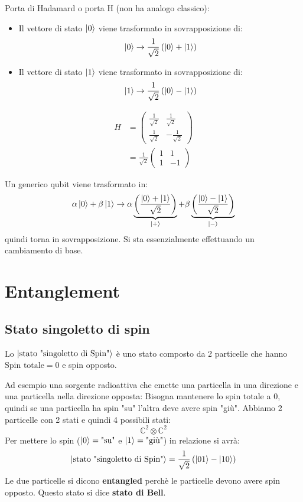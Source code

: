 \documentclass[a4paper]{article}
\begin{document}
\vspace{1em}
\noindent
Porta di Hadamard o porta H (non ha analogo classico):
\begin{itemize}
  \item 
    Il vettore di stato \( \ket{0} \) viene trasformato in sovrapposizione di:
    \[
      \ket{0} \to \frac{1}{\sqrt{2}} \left( \ket{0} + \ket{1} \right)
    \] 
  \item 
    Il vettore di stato \( \ket{1} \) viene trasformato in sovrapposizione di:
    \[
      \ket{1} \to \frac{1}{\sqrt{2}} \left( \ket{0} - \ket{1} \right)
    \]
\end{itemize}
\[
  \begin{aligned}
    H &= \begin{pmatrix} 
      \frac{1}{\sqrt{2}} & \frac{1}{\sqrt{2}}\\
      \frac{1}{\sqrt{2}} & -\frac{1}{\sqrt{2}}
    \end{pmatrix} \\
      &= \frac{1}{\sqrt{2}} \begin{pmatrix} 
        1 & 1\\
        1 & -1
      \end{pmatrix} 
  \end{aligned}
\] 

\vspace{1em}
\noindent
Un generico qubit viene trasformato in:
\[
  \alpha \ket{0} + \beta \ket{1} \to 
  \alpha \underbrace{\left( \frac{\ket{0} + \ket{1}}{\sqrt{2} } \right)}_{\ket{+}} +
  \beta \underbrace{\left( \frac{\ket{0} - \ket{1}}{\sqrt{2} } \right)}_{\ket{-}}
\] 
quindi torna in sovrapposizione. Si sta essenzialmente effettuando un cambiamento di base.

\section{Entanglement}
\subsection{Stato singoletto di spin}
Lo \( \ket{\text{stato "singoletto di Spin"}} \) è uno stato composto da 2 particelle
che hanno \( \text{Spin totale} = 0 \)  e spin opposto.

\vspace{1em}
\noindent
Ad esempio una sorgente
radioattiva che emette una particella in una direzione e una particella nella direzione
opposta:
\label{17-01-D2}
\noindent
Bisogna mantenere lo spin totale a 0, quindi se una particella ha spin "su" l'altra
deve avere spin "giù". Abbiamo 2 particelle con 2 stati e quindi 4 possibili stati:
\[
  \mathbb{C}^2 \otimes \mathbb{C}^2
\] 
Per mettere lo spin (\( \ket{0} = \text{"su"} \) e \( \ket{1} = \text{"giù"} \)) in relazione si avrà:
\[
  \ket{\text{stato "singoletto di Spin"}} =
  \frac{1}{\sqrt{2}} \left( \ket{01} - \ket{10} \right)
\] 
Le due particelle si dicono \textbf{entangled} perchè le particelle devono avere spin
opposto. Questo stato si dice \textbf{stato di Bell}.
\end{document}

